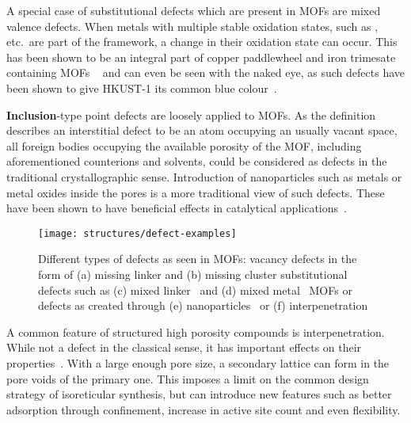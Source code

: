 A special case of substitutional defects which are present in \glspl{MOF}
are mixed valence defects. When metals with multiple stable oxidation
states, such as ,  etc.\ are part of
the framework, a change in their oxidation state can occur. This has
been shown to be an integral part of copper paddlewheel and
iron trimesate containing \glspl{MOF}
~\cite{yoonControlledReducibilityMetalOrganic2010} and can even be
seen with the naked eye, as such defects have been shown
to give HKUST-1 its common blue colour~\cite{mullerDefectsColorCenters2017}.

\textbf{Inclusion}-type point defects are loosely applied to \glspl{MOF}.
As the definition describes an interstitial defect
to be an atom occupying an usually vacant space, all foreign
bodies occupying the available porosity of the \gls{MOF}, including
aforementioned counterions and solvents, could be considered as
defects in the traditional crystallographic sense.
Introduction of nanoparticles such as metals or metal oxides
inside the pores is a more traditional view of such defects.
These have been shown to have beneficial
effects in catalytical
applications~\cite{falcaroApplicationMetalMetal2016, %
    schroderRutheniumNanoparticlesPorous2008}.

\begin{figure}[tb]
	\centering

	\texttt{[image: structures/defect-examples]}
	\caption{
		Different types of defects as seen in \glspl{MOF}: 
		vacancy defects in the form of (a) missing linker and 
		(b) missing cluster substitutional defects such as
		(c) mixed linker~\cite{buekenTacklingDefectConundrum2017}
		and (d) mixed metal~\cite{vuongSynthesisEngineeringPorosity2013} \glspl{MOF} or defects 
		as created through (e) nanoparticles~\cite{schroderRutheniumNanoparticlesPorous2008}
		or (f) interpenetration~\cite{yaoInterpenetratedMetalOrganic2012}
	}%
	\label{def:fig:defect-types}
\end{figure}

A common feature of structured high porosity compounds is
interpenetration. While not a defect in the classical sense,
it has important effects on their 
properties~\cite{haldarInterpenetrationCoordinationPolymers2015}.
With a large enough pore size, a secondary lattice can form in the
pore voids of the primary one. This imposes a limit on the
common design strategy of isoreticular synthesis, but can
introduce new features such as better adsorption through
confinement, increase in active site count and even flexibility.

